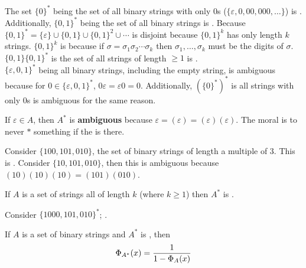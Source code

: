 \documentclass[english, 11pt]{article}
\begin{document}
   \begin{exmp}
     The set $\{ 0 \}^*$ being the set of all binary strings with only 0s ($\{ \varepsilon, 0, 00, 000, \ldots \}$) is . Additionally, $\{ 0,1\}^*$ being the set of all binary strings is . Because $\{0,1\}^* = \{\varepsilon\} \cup \{ 0,1 \} \cup \{0,1\}^2 \cup \cdots$ is disjoint because $\{ 0,1\}^k$ has only length $k$ strings. $\{ 0,1 \}^k$ is  because if $\sigma = \sigma_1\sigma_2\cdots\sigma_k$ then $\sigma_1,\ldots,\sigma_k$ must be the digits of $\sigma$. \\

     $\{ 0,1 \}\{0,1\}^*$ is the set of all strings of length $\geq 1$ is . \\

     $\{\varepsilon, 0, 1\}^*$ being all binary strings, including the empty string, is ambiguous because for $0 \in \{ \varepsilon, 0 , 1\}^*$, $0\varepsilon = \varepsilon0 = 0$. Additionally, $(\{ 0\}^*)^*$ is all strings with only 0s is ambiguous for the same reason.

     \begin{note}
       If $\varepsilon \in A$, then $A^*$ is \textbf{ambiguous} because $\varepsilon = (\varepsilon) = (\varepsilon)(\varepsilon)$. The moral is to never $*$ something if the  is there.
     \end{note}


       Consider $\{100,101,010\}$, the set of binary strings of length a multiple of 3. This is . Consider $\{ 10,101,010 \}$, then this is ambiguous because $(10)(10)(10) = (101)(010)$.




     \begin{note}
       If $A$ is a set of strings all of length $k$ (where $k \geq 1$) then $A^*$ is .
     \end{note}

     Consider $\{1000,101,010\}^*$; .

     \end{exmp}

     \begin{thrm}\label{finite string lemma}
       If $A$ is a set of binary strings and $A^*$ is , then
       \[ \Phi_{A^*}(x) = \frac{1}{1-\Phi_A(x)} \]
     \end{thrm}
\end{document}
